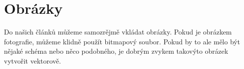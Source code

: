 \documentclass[a4paper, 11pt]{article}
\begin{document}
\section{Obrázky}

Do našich článků můžeme samozrějmě vkládat obrázky. Pokud je obrázkem fotografie, můžeme klidně použít bitmapový soubor. Pokud by to ale mělo být nějaké schéma nebo něco podobného, je dobrým zvykem takovýto obrázek vytvořit vektorově.

\begin{figure}[ht]
    \centering
\end{figure}
\end{document}
